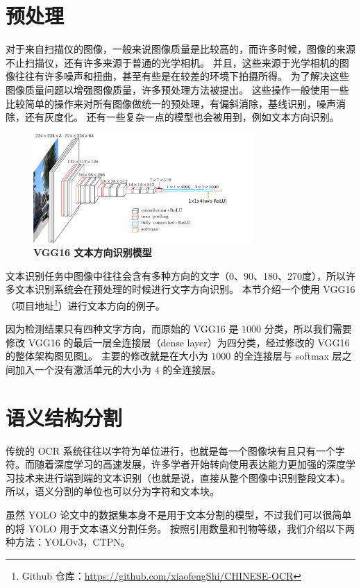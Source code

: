 \section{预处理}
对于来自扫描仪的图像，一般来说图像质量是比较高的，而许多时候，图像的来源不止扫描仪，还有许多来源于普通的光学相机。
并且，这些来源于光学相机的图像往往有许多噪声和扭曲，甚至有些是在较差的环境下拍摄所得。
为了解决这些图像质量问题以增强图像质量，许多预处理方法被提出。
这些操作一般使用一些比较简单的操作来对所有图像做统一的预处理，有偏斜消除，基线识别，噪声消除，还有灰度化。
还有一些复杂一点的模型也会被用到，例如文本方向识别。

\begin{figure}[h!]
	\centering
	\includegraphics[width=0.75\textwidth]{figure/resources/vgg16_text_angle.png}
	\caption{\textbf{VGG16 文本方向识别模型}\label{vgg16_text_angle}}
\end{figure}

文本识别任务中图像中往往会含有多种方向的文字（0、90、180、270度），所以许多文本识别系统会在预处理的时候进行文字方向识别。
本节介绍一个使用 VGG16\cite{vgg} （项目地址\footnote{Github 仓库：\url{https://github.com/xiaofengShi/CHINESE-OCR}}）进行文本方向的例子。

因为检测结果只有四种文字方向，而原始的 VGG16 是 $1000$ 分类，所以我们需要修改 VGG16 的最后一层全连接层（dense layer）为四分类，经过修改的 VGG16 的整体架构图见图\ref{vgg16_text_angle}。
主要的修改就是在大小为 $1000$ 的全连接层与 softmax 层之间加入一个没有激活单元的大小为 $4$ 的全连接层。

\section{语义结构分割}
传统的 OCR 系统往往以字符为单位进行，也就是每一个图像块有且只有一个字符。而随着深度学习的高速发展，许多学者开始转向使用表达能力更加强的深度学习技术来进行端到端的文本识别（也就是说，直接从整个图像中识别整段文本）。
所以，语义分割的单位也可以分为字符和文本块。

虽然 YOLO 论文中的数据集本身不是用于文本分割的模型，不过我们可以很简单的将 YOLO 用于文本语义分割任务。
按照引用数量和刊物等级，我们介绍以下两种方法：YOLOv3\cite{yolov3}，CTPN\cite{CTPN}。

